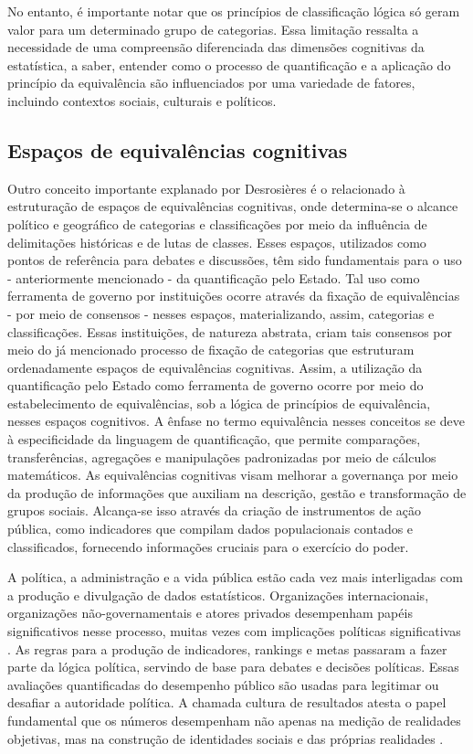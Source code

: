 No entanto, é importante notar que os princípios de classificação lógica só geram valor para um determinado grupo de categorias. Essa limitação ressalta a necessidade de uma compreensão diferenciada das dimensões cognitivas da estatística, a saber, entender como o processo de quantificação e a aplicação do princípio da equivalência são influenciados por uma variedade de fatores, incluindo contextos sociais, culturais e políticos.

\subsection{Espaços de equivalências cognitivas}

Outro conceito importante explanado por Desrosières é o relacionado à estruturação de espaços de equivalências cognitivas, onde determina-se o alcance político e geográfico de categorias e classificações por meio da influência de delimitações históricas e de lutas de classes. Esses espaços, utilizados como pontos de referência para debates e discussões, têm sido fundamentais para o uso - anteriormente mencionado - da quantificação pelo Estado. Tal uso como ferramenta de governo por instituições ocorre através da fixação de equivalências - por meio de consensos - nesses espaços, materializando, assim, categorias e classificações. Essas instituições, de natureza abstrata, criam tais consensos por meio do já mencionado processo de fixação de categorias que estruturam ordenadamente espaços de equivalências cognitivas. Assim, a utilização da quantificação pelo Estado como ferramenta de governo ocorre por meio do estabelecimento de equivalências, sob a lógica de princípios de equivalência, nesses espaços cognitivos. A ênfase no termo equivalência nesses conceitos se deve à especificidade da linguagem de quantificação, que permite comparações, transferências, agregações e manipulações padronizadas por meio de cálculos matemáticos. As equivalências cognitivas visam melhorar a governança por meio da produção de informações que auxiliam na descrição, gestão e transformação de grupos sociais. Alcança-se isso através da criação de instrumentos de ação pública, como indicadores que compilam dados populacionais contados e classificados, fornecendo informações cruciais para o exercício do poder.

A política, a administração e a vida pública estão cada vez mais interligadas com a produção e divulgação de dados estatísticos. Organizações internacionais, organizações não-governamentais e atores privados desempenham papéis significativos nesse processo, muitas vezes com implicações políticas significativas \cite{desrosieres2008argument}. As regras para a produção de indicadores, rankings e metas passaram a fazer parte da lógica política, servindo de base para debates e decisões políticas. Essas avaliações quantificadas do desempenho público são usadas para legitimar ou desafiar a autoridade política. A chamada cultura de resultados atesta o papel fundamental que os números desempenham não apenas na medição de realidades objetivas, mas na construção de identidades sociais e das próprias realidades \cite{berman2018sociology}.

